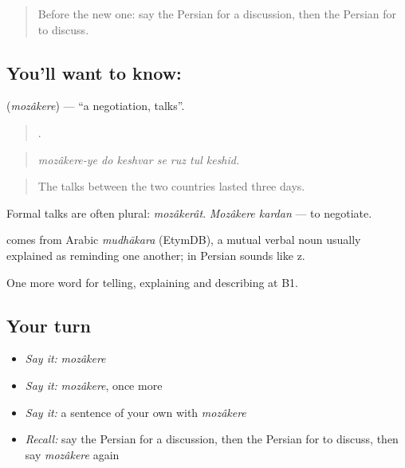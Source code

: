 \label{lesson:FA-C366-mozakere}



\begin{quote}
Before the new one: say the Persian for a discussion, then the Persian for to discuss.
\end{quote}

\subsection*{You'll want to know: }
\textbf{} (\emph{mozâkere}) — \textquotedblleft{}a negotiation, talks\textquotedblright{}.

\begin{quote}
      .
\end{quote}

\begin{quote}
\emph{mozâkere-ye do keshvar se ruz tul keshid.}
\end{quote}

\begin{quote}
The talks between the two countries lasted three days.
\end{quote}

Formal talks are often plural: \emph{mozâkerât}. \emph{Mozâkere kardan} — to negotiate.

\begin{cousinweb}
\textbf{} comes from Arabic \emph{mudhākara} (EtymDB), a mutual verbal noun usually explained as reminding one another; in Persian  sounds like z.
\end{cousinweb}

\begin{grammarlens}[title={What you've built}]
One more word for telling, explaining and describing at B1.
\end{grammarlens}

\subsection*{Your turn}
\begin{itemize}
\raggedright
  \item \emph{Say it:} \emph{mozâkere}
  \item \emph{Say it:} \emph{mozâkere}, once more
  \item \emph{Say it:} a sentence of your own with \emph{mozâkere}
  \item \emph{Recall:} say the Persian for a discussion, then the Persian for to discuss, then say \emph{mozâkere} again
\end{itemize}

